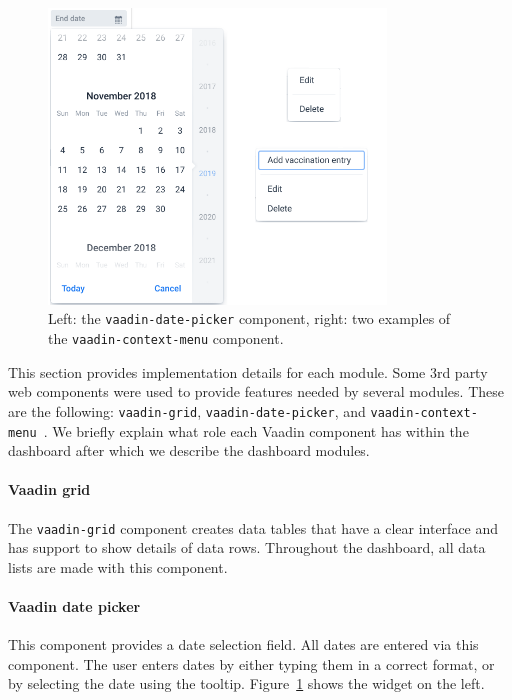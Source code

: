         \begin{figure}[t]
            \centering
            \includegraphics[width=0.8\textwidth]{chapters/4_implementation/vaadin-comps}
            \caption{Left: the \texttt{vaadin-date-picker} component, right: two examples of the \texttt{vaadin-context-menu} component.}\label{fig:vaadin-comps}
        \end{figure}

        This section provides implementation details for each module. Some 3rd party web components were used to provide features needed by several modules. These are the following: \texttt{vaadin-grid}, \texttt{vaadin-date-picker}, and \texttt{vaadin-context-
        menu}~\cite{Vaadin}. We briefly explain what role each Vaadin component has within the dashboard after which we describe the dashboard modules.

        \paragraph{Vaadin grid} The \texttt{vaadin-grid} component creates data tables that have a clear interface and has support to show details of data rows. Throughout the dashboard, all data lists are made with this component.

        \paragraph{Vaadin date picker} This component provides a date selection field. All dates are entered via this component. The user enters dates by either typing them in a correct format, or by selecting the date using the tooltip. Figure~\ref{fig:vaadin-comps} shows the widget on the left.


